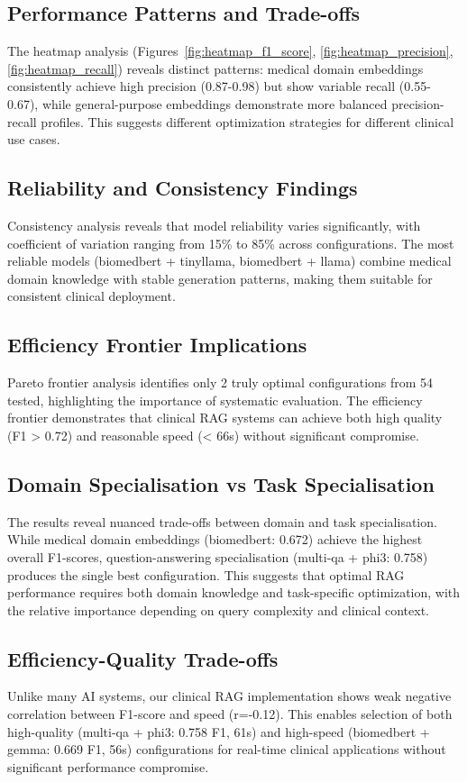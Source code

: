 \subsection{Performance Patterns and Trade-offs}
The heatmap analysis (Figures~\ref{fig:heatmap_f1_score}, \ref{fig:heatmap_precision}, \ref{fig:heatmap_recall}) reveals distinct patterns: medical domain embeddings consistently achieve high precision (0.87-0.98) but show variable recall (0.55-0.67), while general-purpose embeddings demonstrate more balanced precision-recall profiles. This suggests different optimization strategies for different clinical use cases.

\subsection{Reliability and Consistency Findings}
Consistency analysis reveals that model reliability varies significantly, with coefficient of variation ranging from 15\% to 85\% across configurations. The most reliable models (biomedbert + tinyllama, biomedbert + llama) combine medical domain knowledge with stable generation patterns, making them suitable for consistent clinical deployment.

\subsection{Efficiency Frontier Implications}
Pareto frontier analysis identifies only 2 truly optimal configurations from 54 tested, highlighting the importance of systematic evaluation. The efficiency frontier demonstrates that clinical RAG systems can achieve both high quality (F1 > 0.72) and reasonable speed (< 66s) without significant compromise.

\subsection{Domain Specialisation vs Task Specialisation}
The results reveal nuanced trade-offs between domain and task specialisation. While medical domain embeddings (biomedbert: 0.672) achieve the highest overall F1-scores, question-answering specialisation (multi-qa + phi3: 0.758) produces the single best configuration. This suggests that optimal RAG performance requires both domain knowledge and task-specific optimization, with the relative importance depending on query complexity and clinical context.

\subsection{Efficiency-Quality Trade-offs}
Unlike many AI systems, our clinical RAG implementation shows weak negative correlation between F1-score and speed (r=-0.12). This enables selection of both high-quality (multi-qa + phi3: 0.758 F1, 61s) and high-speed (biomedbert + gemma: 0.669 F1, 56s) configurations for real-time clinical applications without significant performance compromise.

